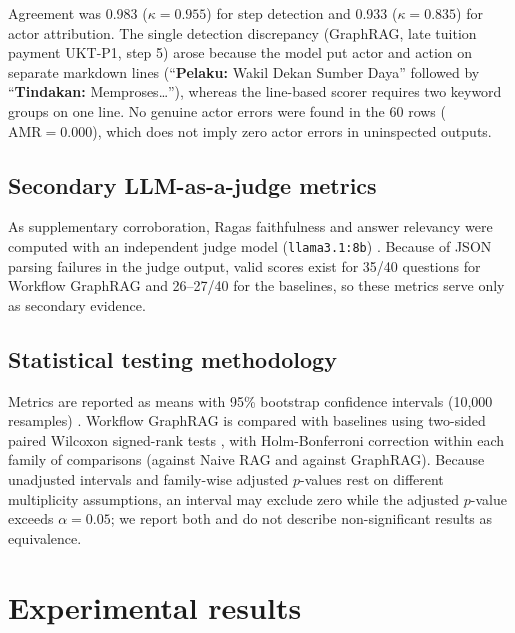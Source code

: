 \documentclass[preprint,10pt]{elsarticle}
\begin{document}
\begin{table}[!htbp]
\centering
\caption{Manual audit of deterministic step-alignment scorer across 60 sampled rows (Naive RAG, GraphRAG, and Workflow GraphRAG).}
\label{tab:audit}
\small

\end{table}

Agreement was 0.983 ($\kappa=0.955$) for step detection and 0.933 ($\kappa=0.835$) for actor attribution. The single detection discrepancy (GraphRAG, late tuition payment UKT-P1, step 5) arose because the model put actor and action on separate markdown lines (``\textbf{Pelaku:} Wakil Dekan Sumber Daya'' followed by ``\textbf{Tindakan:} Memproses\dots''), whereas the line-based scorer requires two keyword groups on one line. No genuine actor errors were found in the 60 rows ($\text{AMR}=0.000$), which does not imply zero actor errors in uninspected outputs.

\subsection{Secondary LLM-as-a-judge metrics}
As supplementary corroboration, Ragas faithfulness and answer relevancy \cite{es2024ragas} were computed with an independent judge model (\texttt{llama3.1:8b}) \cite{zheng2023judging}. Because of JSON parsing failures in the judge output, valid scores exist for 35/40 questions for Workflow GraphRAG and 26--27/40 for the baselines, so these metrics serve only as secondary evidence.

\subsection{Statistical testing methodology}
Metrics are reported as means with 95\% bootstrap confidence intervals (10,000 resamples) \cite{efron1993bootstrap}. Workflow GraphRAG is compared with baselines using two-sided paired Wilcoxon signed-rank tests \cite{wilcoxon1945}, with Holm-Bonferroni correction \cite{holm1979} within each family of comparisons (against Naive RAG and against GraphRAG). Because unadjusted intervals and family-wise adjusted $p$-values rest on different multiplicity assumptions, an interval may exclude zero while the adjusted $p$-value exceeds $\alpha=0.05$; we report both and do not describe non-significant results as equivalence.

\section{Experimental results}
\label{sec:results}
\end{document}
